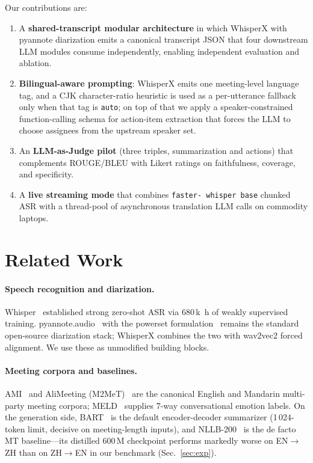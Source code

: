 \documentclass[11pt,a4paper]{article}
\begin{document}
Our contributions are:
\begin{enumerate}[label=(\roman*)]
\item A \textbf{shared-transcript modular architecture} in which
WhisperX with pyannote diarization emits a canonical transcript JSON
that four downstream LLM modules consume independently, enabling
independent evaluation and ablation.
\item \textbf{Bilingual-aware prompting}: WhisperX emits one
meeting-level language tag, and a CJK character-ratio heuristic is
used as a per-utterance fallback only when that tag is
\texttt{auto}; on top of that we apply a speaker-constrained
function-calling schema for action-item extraction that forces the
LLM to choose assignees from the upstream speaker set.
\item An \textbf{LLM-as-Judge pilot} (three triples, summarization and
actions) that complements ROUGE/BLEU with Likert ratings on
faithfulness, coverage, and specificity.
\item A \textbf{live streaming mode} that combines \texttt{faster-%
whisper base} chunked ASR with a thread-pool of asynchronous
translation LLM calls on commodity laptops.
\end{enumerate}

\section{Related Work}
\label{sec:related}
\paragraph{Speech recognition and diarization.}
Whisper~\cite{radford2023whisper} established strong zero-shot ASR
via 680\,k~h of weakly supervised training.
pyannote.audio~\cite{bredin2020pyannote} with the powerset
formulation~\cite{plaquet23powerset} remains the standard open-source
diarization stack; WhisperX combines the two with wav2vec2 forced
alignment. We use these as unmodified building blocks.

\paragraph{Meeting corpora and baselines.}
AMI~\cite{carletta2006ami} and AliMeeting (M2MeT)~\cite{yu2022m2met}
are the canonical English and Mandarin multi-party meeting corpora;
MELD~\cite{poria2019meld} supplies 7-way conversational emotion
labels. On the generation side, BART~\cite{lewis2020bart} is the
default encoder-decoder summarizer (1\,024-token limit, decisive on
meeting-length inputs), and NLLB-200~\cite{nllb2022} is the de
facto MT baseline---its distilled 600\,M checkpoint performs
markedly worse on EN$\to$ZH than on ZH$\to$EN in our benchmark
(Sec.~\ref{sec:exp}).
\end{document}
